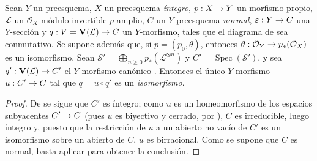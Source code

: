 \documentclass[oneside,10pt]{amsart}
\makeatletter
\newcommand{\ega@arrow}[2]{\mathchoice{#1}{#2}{#2}{#2}}
\renewcommand{\to}{\ega@arrow{\longrightarrow}{\rightarrow}}
\let\EGAOriginalLabel\label
\renewcommand{\label}[1]{\phantomsection\EGAOriginalLabel{#1}}
\makeatother
\begin{document}
\begin{proposition}[8.11.7]
\label{II.8.11.7-fr}
Sean $Y$ un preesquema, $X$ un preesquema \emph{íntegro}, $p:X\to Y$ un morfismo propio, $\mathcal{L}$ un $\mathcal{O}_X$-módulo invertible $p$-amplio, $C$ un $Y$-preesquema \emph{normal}, $\varepsilon:Y\to C$ una $Y$-sección y $q:V=\mathbf{V}(\mathcal{L})\to C$ un $Y$-morfismo, tales que el diagrama de  sea conmutativo.
Se supone además que, si $p=(p_0,\theta)$, entonces $\theta:\mathcal{O}_Y\to p_*(\mathcal{O}_X)$ es un isomorfismo.
Sean $\mathcal{S}'=\bigoplus_{n\geqslant0}p_*(\mathcal{L}^{\otimes n})$ y $C'=\operatorname{Spec}(\mathcal{S}')$, \textup{y} sea $q':\mathbf{V}(\mathcal{L})\to C'$ el $Y$-morfismo canónico .
Entonces el único $Y$-morfismo $u:C'\to C$ tal que $q=u\circ q'$ es un \emph{isomorfismo}.
\end{proposition}

\begin{proof}
De  se sigue que $C'$ es íntegro;
como $u$ es un homeomorfismo de los espacios subyacentes $C'\to C$ (pues $u$ es biyectivo y cerrado, por ), $C$ es irreducible, luego íntegro y, puesto que la restricción de $u$ a un abierto no vacío de $C'$ es un isomorfismo sobre un abierto de $C$, $u$ es birracional.
Como se supone que $C$ es normal, basta aplicar  para obtener la conclusión.
\end{proof}
\end{document}
